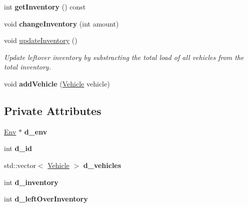 \begin{DoxyCompactItemize}
\mbox{\label{class_depot_ab8d9a6cba5eb3aa4d860e13435dd64df}} 
int {\bfseries get\+Inventory} () const
\item 
\mbox{\label{class_depot_a91c675fef3c934b87f387050c43f2087}} 
void {\bfseries change\+Inventory} (int amount)
\item 
\mbox{\label{class_depot_aad95f075e3df31cfcb7951d4572265f3}} 
void \hyperlink{class_depot_aad95f075e3df31cfcb7951d4572265f3}{update\+Inventory} ()
\begin{DoxyCompactList}\small\item\em Update leftover inventory by substracting the total load of all vehicles from the total inventory. \end{DoxyCompactList}\item 
\mbox{\label{class_depot_a68e6c378cf4527839c67e8e417560744}} 
void {\bfseries add\+Vehicle} (\hyperlink{class_vehicle}{Vehicle} vehicle)
\end{DoxyCompactItemize}
\subsection*{Private Attributes}
\begin{DoxyCompactItemize}
\item 
\mbox{\label{class_depot_a182a0a8e85a7cee44aaa9c1895a8d05a}} 
\hyperlink{class_env}{Env} $\ast$ {\bfseries d\+\_\+env}
\item 
\mbox{\label{class_depot_a1a1a1a9e2d0952f6446247f706fcaa97}} 
int {\bfseries d\+\_\+id}
\item 
\mbox{\label{class_depot_a3037941bb91b32aed2a37bf39cda0917}} 
std\+::vector$<$ \hyperlink{class_vehicle}{Vehicle} $>$ {\bfseries d\+\_\+vehicles}
\item 
\mbox{\label{class_depot_acf5df9f1ee607052c50fc2f56d167609}} 
int {\bfseries d\+\_\+inventory}
\item 
\mbox{\label{class_depot_af81ace5d9d43b962c966f397b527ee48}} 
int {\bfseries d\+\_\+left\+Over\+Inventory}
\end{DoxyCompactItemize}

